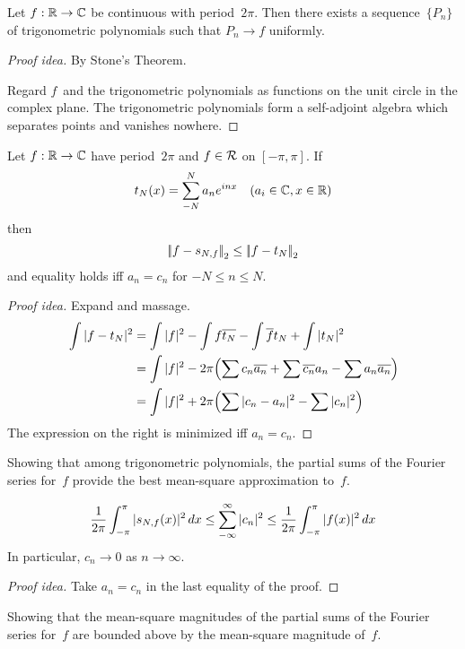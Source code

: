 \begin{thm}
Let \(f:\mathbb{R}\to\mathbb{C}\) be continuous with period~\(2\pi\). Then there exists a sequence~\(\{P_n\}\) of trigonometric polynomials such that \(P_n\to f\) uniformly.
\end{thm}
\begin{proof}[Proof idea]
By Stone's Theorem.

Regard \(f\)~and the trigonometric polynomials as functions on the unit circle in the complex plane. The trigonometric polynomials form a self-adjoint algebra which separates points and vanishes nowhere.
\end{proof}

\begin{thm}
Let \(f:\mathbb{R}\to\mathbb{C}\) have period~\(2\pi\) and \(f\in\mathcal{R}\) on \([-\pi,\pi]\). If
\[t_N(x)=\sum_{-N}^N a_n e^{inx}\quad(a_i\in\mathbb{C},x\in\mathbb{R})\]
then
\[\left|\!\left|{f-s_{N,f}}\right|\!\right|_2\le\left|\!\left|{f-t_N}\right|\!\right|_2\]
and equality holds iff \(a_n=c_n\) for \(-N\le n\le N\).
\end{thm}
\begin{proof}[Proof idea]
Expand and massage.
\begin{align*}
\int|{f-t_N}|^2&=\int|{f}|^2-\int f\overline{t_N}-\int\overline{f}t_N+\int|{t_N}|^2\\
	&=\int|{f}|^2-2\pi\Bigl(\sum c_n\overline{a_n}+\sum\overline{c_n}a_n-\sum a_n\overline{a_n}\Bigr)\\
	&=\int|{f}|^2+2\pi\Bigl(\sum|{c_n-a_n}|^2-\sum|{c_n}|^2\Bigr)
\end{align*}
The expression on the right is minimized iff \(a_n=c_n\).
\end{proof}
\begin{app}
Showing that among trigonometric polynomials, the partial sums of the Fourier series for~\(f\) provide the best mean-square approximation to~\(f\).
\end{app}
\begin{cor}
\[\frac{1}{2\pi}\int_{-\pi}^\pi|{s_{N,f}(x)}|^2\,dx\le\sum_{-\infty}^\infty|{c_n}|^2\le\frac{1}{2\pi}\int_{-\pi}^\pi|{f(x)}|^2\,dx\]
In particular, \(c_n\to0\) as \(n\to\infty\).
\end{cor}
\begin{proof}[Proof idea]
Take \(a_n=c_n\) in the last equality of the proof.
\end{proof}
\begin{app}
Showing that the mean-square magnitudes of the partial sums of the Fourier series for~\(f\) are bounded above by the mean-square magnitude of~\(f\).
\end{app}


